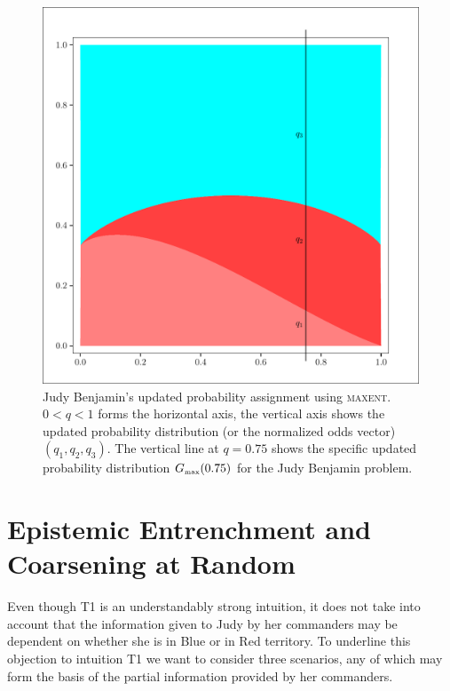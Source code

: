 \documentclass[smallextended]{svjour3}       %
\newcommand{\nias}{\noindent} %
\newcommand{\lwv}[0]{0.6}
\begin{document}
\begin{figure}[h]
  \begin{flushright}
    \begin{minipage}[h]{\lwv\linewidth}
      \includegraphics[width=\textwidth]{zeroone-mxnt.pdf}
      \caption{Judy Benjamin's updated probability assignment using
        \textsc{maxent}. $0<q<1$ forms the horizontal axis, the
        vertical axis shows the updated probability distribution (or
        the normalized odds vector) $(q_{1},q_{2},q_{3})$. The
        vertical line at $q=0.75$ shows the specific updated
        probability distribution $G_{\mbox{\tiny max}}(0.75)$ for the Judy
        Benjamin problem.}
      \label{fig:mxnt}
    \end{minipage}
  \end{flushright}
\end{figure}

\section{Epistemic Entrenchment and Coarsening at Random}
\label{sec:3}

\nias Even though T1 is an understandably strong intuition, it does
not take into account that the information given to Judy by her
commanders may be dependent on whether she is in Blue or in Red
territory. To underline this objection to intuition T1 we want to
consider three scenarios, any of which may form the basis of the
partial information provided by her commanders.
\end{document}
